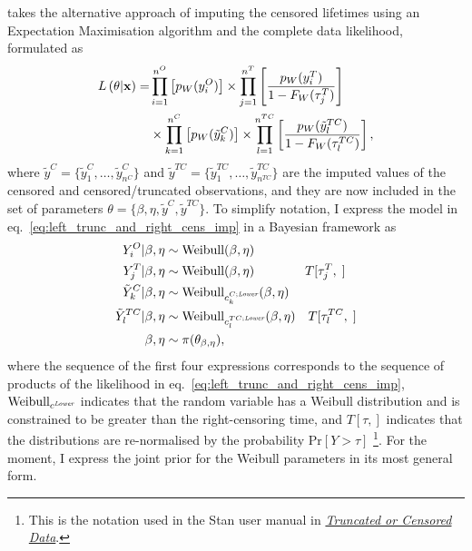\citet{mitra2013} takes the alternative approach of imputing the censored lifetimes using an Expectation Maximisation algorithm and the complete data likelihood, formulated as
\begin{align}
    \label{eq:left_trunc_and_right_cens_imp}
    L\left(\theta|\hbox{\textbf{x}}\right) = & 
    \prod^{n^O}_{i = 1}\left[p_W(y^O_i) \right] \times
    \prod^{n^T}_{j = 1}\left[\frac{p_W(y^T_i)}{1 - F_W(\tau^T_j)} \right] \\
    & \times \prod^{n^C}_{k = 1}\left[p_W(\tilde{y}^C_k)\right]
    \times \prod^{n^{TC}}_{l = 1}\left[\frac{p_W(\tilde{y}^{TC}_l)}{1 - F_W(\tau^{TC}_l)}\right] \nonumber,
\end{align}
where $\tilde{y}^C = \{\tilde{y}^C_1, \dots, \tilde{y}^C_{n^C}\}$ and $\tilde{y}^{TC} = \{\tilde{y}^{TC}_1, \dots, \tilde{y}^{TC}_{n^{TC}}\}$ are the imputed values of the censored and censored/truncated observations, and they are now included in the set of parameters $\theta = \{\beta, \eta, \tilde{y}^C, \tilde{y}^{TC}\}$. To simplify notation, I express the model in eq.~\eqref{eq:left_trunc_and_right_cens_imp} in a Bayesian framework as
\begin{align*}
    Y^O_i|\beta, \eta    & \sim \hbox{Weibull}(\beta, \eta) \\
    Y^T_j|\beta, \eta    & \sim \hbox{Weibull}(\beta, \eta) \qquad \qquad T[\tau^T_j, \;]\\
    \tilde{Y}^C_k|\beta, \eta    & \sim \hbox{Weibull}_{c^{C;\textit{\tiny{Lower}}}_k}(\beta, \eta) \\
    \tilde{Y}^{TC}_l|\beta, \eta & \sim \hbox{Weibull}_{c^{TC;\textit{\tiny{Lower}}}_l}(\beta, \eta) \quad T[\tau^{TC}_l, \;] \\
    \beta, \eta & \sim \pi(\theta_{\beta, \eta}),
\end{align*}
where the sequence of the first four expressions corresponds to the sequence of products of the likelihood in eq.~\eqref{eq:left_trunc_and_right_cens_imp}, $\hbox{Weibull}_{c^{\textit{\tiny{Lower}}}}$ indicates that the random variable has a Weibull distribution and is constrained to be greater than the right-censoring time, and $T[\tau, ]$ indicates that the distributions are re-normalised by the probability $\text{Pr}\left[Y > \tau\right]$ \citep{Stan2022} \footnote{This is the notation used in the Stan user manual in \href{https://mc-stan.org/docs/stan-users-guide/truncation-censoring.html}{\textit{Truncated or Censored Data}}.}. For the moment, I express the joint prior for the Weibull parameters in its most general form.

